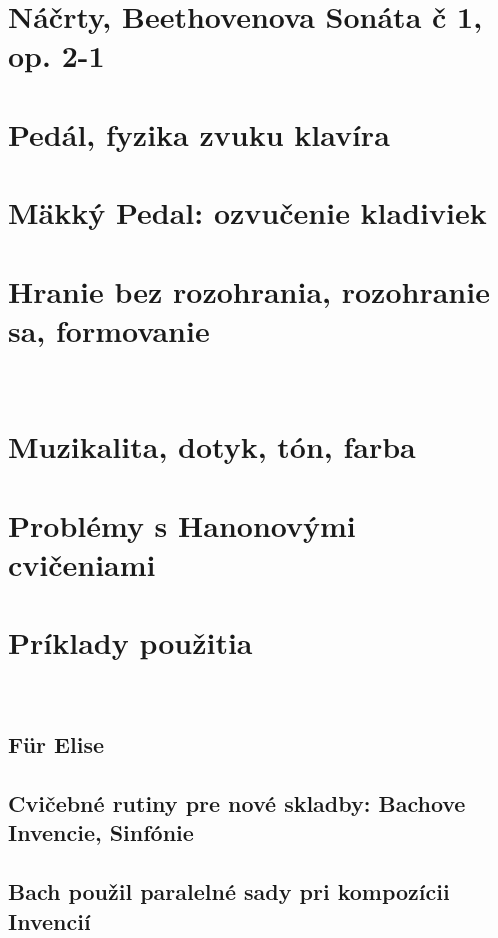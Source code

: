 \documentclass[11pt,a4paper]{book}
\begin{document}
\section{Náčrty, Beethovenova Sonáta č 1, op. 2-1}\label{s:outlining}

\section{Pedál, fyzika zvuku klavíra}\label{s:damper-pedal}

\section{Mäkký Pedal: ozvučenie kladiviek}\label{s:soft-pedal}

\section{Hranie bez rozohrania, rozohranie sa, formovanie}\label{s:playing-cold}
\ 
\section{Muzikalita, dotyk, tón, farba}\label{s:musicality}

\section{Problémy s Hanonovými cvičeniami}\label{s:problems-hanon}

\section{Príklady použitia}\label{s:examples-applications}
\ 
\subsection{Für Elise}\label{s:fur-elise}

\subsection{Cvičebné rutiny pre nové skladby: Bachove Invencie, Sinfónie}\label{s:bach-inventions}

\subsection{Bach použil paralelné sady pri kompozícii Invencií}\label{s:bach-sets}
\end{document}

